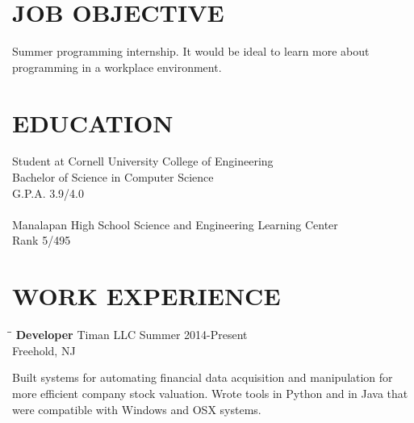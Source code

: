 \documentclass{res}
\begin{document}
 


\address{\bf  PRESENT ADDRESS\\3639 Clara Dickson Hall\\Ithaca, NY 14853\\(732) 977-7316\\hjg42@cornell.edu}
\address{\bf PERMANENT ADDRESS \\15 Monarch Ln.\\Freehold, NJ 07728\\(732) 977-7316\\hgoldstein95@gmail.com}
              
\begin{resume}

\section{JOB OBJECTIVE}
	Summer programming internship. It would be ideal to learn more about programming in
	a workplace environment.

\section{EDUCATION}
	Student at Cornell University College of Engineering \\
	Bachelor of Science in Computer Science \\
	G.P.A. 3.9/4.0 \\\\
	Manalapan High School Science and Engineering Learning Center \\
	Rank 5/495
 
\section{WORK EXPERIENCE}
   \vspace{-0.1in}	
   \begin{tabbing}
   \hspace{2.3in}\= \hspace{2.4in}\= \kill %
    {\bf Developer} \>Timan LLC     \>Summer 2014-Present\\
                             \>Freehold, NJ
   \end{tabbing}\vspace{-20pt}
    Built systems for automating financial data acquisition and manipulation for more 
    efficient company stock valuation. Wrote tools in Python and in Java that were
    compatible with Windows and OSX systems.
   

\end{resume}
\end{document}
